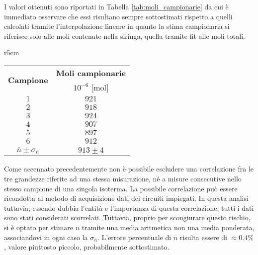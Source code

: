 \documentclass[a4paper,11pt,oneside]{article}
\begin{document}
I valori ottenuti sono riportati in Tabella \ref{tab:moli_campionarie} da cui è immediato osservare che essi risultano sempre sottostimati rispetto a quelli calcolati tramite l'interpolazione lineare in quanto la stima campionaria si riferisce solo alle moli contenute nella siringa, quella tramite fit alle moli totali.

\begin{wraptable}{r}{5cm}
    \begin{tabular}{|c|c|}
        \hline
        \multirow{2}{*}{\textbf{Campione}} & \textbf{Moli campionarie}\\
        & $10^{-6}$ [mol] \\ \hline
        \rowcolor[rgb]{0.85,0.85,0.85}$1$ & $921$ \\ \hline
        $2$ & $918$ \\ \hline
        \rowcolor[rgb]{0.85,0.85,0.85}$3$ & $924$ \\ \hline
        $4$ & $907$ \\ \hline
        \rowcolor[rgb]{0.85,0.85,0.85}$5$ & $897$ \\ \hline
        $6$ & $912$ \\ \hline\hline
        \rowcolor[rgb]{0.85,0.85,0.85}$\overline{n}\pm\sigma_{\overline{n}}$ & $913 \pm 4$ \\ \hline
    \end{tabular}
    \caption{Moli Campionarie}
    \label{tab:moli_campionarie}
\end{wraptable}

Come accennato precedentemente non è possibile escludere una correlazione fra le tre grandezze riferite ad una stessa misurazione, né a misure consecutive nello stesso campione di una singola isoterma. La possibile correlazione può essere ricondotta al metodo di acquisizione dati dei circuiti impiegati. In questa analisi tuttavia, essendo dubbia l'entità e l'importanza di questa correlazione, tutti i dati sono stati considerati scorrelati. Tuttavia, proprio per scongiurare questo rischio, si è optato per stimare $\overline{n}$ tramite una media aritmetica non una media ponderata, associandovi in ogni caso la $\sigma_{\overline{n}}$. L'errore percentuale di $\overline{n}$ risulta essere di $\approx 0.4 \%$, valore piuttosto piccolo, probabilmente sottostimato. 
\end{document}
